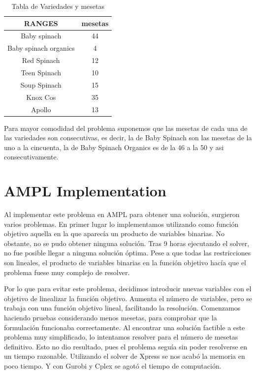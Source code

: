  \begin{table}[ht!]
    \centering
    \begin{minipage}{0.48\textwidth}
        \centering
        \begin{tabular}{|c|c|}
            \hline
            \rowcolor{gray!30} \textbf{\textcolor{grey3}{RANGES}} & \textbf{\textcolor{grey3}{mesetas}}\\
            \hline
            Baby spinach   & 44 \\ \hline
            Baby spinach organics   & 4\\ \hline
            Red Spinach             & 12\\ \hline
            Teen Spinach            & 10\\ \hline
            Soup Spinach & 15 \\ \hline
            Knox Cos     & 35 \\ \hline
            Apollo      & 13 \\ \hline
             
            \hline
        \end{tabular}
        \caption{Tabla de Variedades y mesetas}
        \label{tab:Variedades}
    \end{minipage}
    \hfill
\end{table}
Para mayor comodidad del problema suponemos que las mesetas de cada una de las variedades son consecutivas, es decir, la de Baby Spinach son las mesetas de la 
uno a la cincuenta, la de Baby Spinach Organics es de la 46 a la 50 y asi consecutivamente.
\chapter*{AMPL Implementation} 
Al implementar este problema en AMPL para obtener una solución, surgieron varios problemas. En primer lugar lo implementamos 
utilizando como función objetivo aquella en la que aparecía un producto de variables binarias. No obstante, no se pudo obtener
 ninguna solución. Tras 9 horas ejecutando el solver, no fue posible llegar a ninguna solución óptima. Pese a que todas las restricciones son lineales, el producto de variables binarias en la función objetivo hacía que el problema fuese muy complejo de resolver. 

Por lo que para evitar este problema, decidimos introducir nuevas variables con el objetivo de linealizar la función objetivo. 
Aumenta el número de variables, pero se trabaja con una función objetivo lineal, facilitando la resolución. Comenzamos haciendo
 pruebas considerando menos mesetas, para comprobar que la formulación funcionaba correctamente. Al encontrar una solución factible
  a este problema muy simplificado, lo intentamos resolver para  el número de mesetas definitivo. Esto no dio resultado, pues el
   problema seguía sin poder resolverse en un tiempo razonable. Utilizando el solver de Xpress se nos acabó la memoria en poco 
   tiempo. Y con Gurobi y Cplex se agotó el tiempo de computación. 

